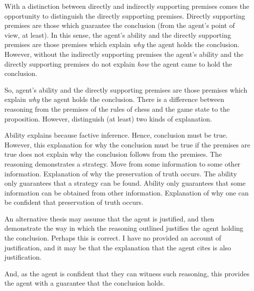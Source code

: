 \documentclass[10pt]{article}
\newcommand{\hozlinedash}[0]{%
  \noindent\hdashrule[0.5ex][c]{\textwidth}{.1pt}{2.5pt}
}
\begin{document}
With a distinction between directly and indirectly supporting premises comes the opportunity to distinguish the directly supporting premises.
Directly supporting premises are those which {\color{red} guarantee} the conclusion (from the agent's point of view, at least).
In this sense, the agent's ability and the directly supporting premises are those premises which explain \emph{why} the agent holds the conclusion.
However, without the indirectly supporting premises the agent's ability and the directly supporting premises do not explain \emph{how} the agent came to hold the conclusion.


So, agent's ability and the directly supporting premises are those premises which explain \emph{why} the agent holds the conclusion.
There is a difference between reasoning from the premises of the rules of chess and the game state to the proposition.
However, distinguish (at least) two kinds of explanation.

Ability explains because factive inference.
Hence, conclusion must be true.
However, this explanation for why the conclusion must be true if the premises are true does not explain why the conclusion follows from the premises.
The reasoning demonstrates a strategy.
Move from some information to some other information.
Explanation of why the preservation of truth occurs.
The ability only guarantees that a strategy can be found.
Ability only guarantees that some information can be obtained from other information.
Explanation of why one can be confident that preservation of truth occurs.









\hozlinedash

An alternative thesis may assume that the agent is justified, and then demonstrate the way in which the reasoning outlined justifies the agent holding the conclusion.
Perhaps this is correct.
I have no provided an account of justification, and it may be that the explanation that the agent cites is also justification.


And, as the agent is confident that they can witness such reasoning, this provides the agent with a guarantee that the conclusion holds.
\end{document}
